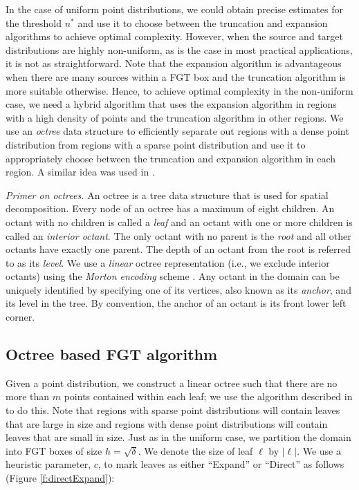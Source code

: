 
 In the case of uniform point distributions, we could obtain precise estimates for the threshold $n^*$ and use it to 
 choose between the truncation and expansion algorithms to achieve optimal complexity. However, when the source and 
 target distributions are highly non-uniform, as is the case in most practical applications, it is not as
 straightforward. Note that the expansion algorithm is advantageous when there are many sources within a FGT box and
 the truncation algorithm is more suitable otherwise. Hence, to achieve optimal complexity in the non-uniform case, we 
 need a hybrid algorithm that uses the expansion algorithm in regions with a high density of points and the 
 truncation algorithm in other regions. We use an {\em octree} \cite{clr90} data structure to efficiently
 separate out regions with a dense point distribution from regions with a sparse point distribution and use
 it to appropriately choose between the truncation and expansion algorithm in each region. A similar idea was
 used in \cite{veerapaneni08}.  
 
{\em Primer on octrees.} An octree is a tree data structure that is used for spatial decomposition. Every
node of an octree has a maximum of eight children. An octant with no children is
called a {\em leaf} and an octant with one or more children is
called an {\em interior octant}. The only octant with no parent is the
 {\em root} and all other octants have exactly one parent. The depth of an octant 
 from the root is referred to as its {\em level}. We use a {\em linear} octree
representation (i.e., we exclude interior octants) using the {\em
Morton encoding} scheme \cite{morton66}. Any octant in the domain can be uniquely
identified by specifying one of its vertices, also known as its {\em
anchor}, and its level in the tree. By convention, the anchor of an
octant is its front lower left corner. 

\subsection{Octree based FGT algorithm}
\label{sc:octreefgt}

 Given a point distribution, we construct a linear octree such that there are no more than $m$ points contained within each leaf; we
 use the algorithm described in \cite{octPaper08} to do this. Note that regions with sparse point distributions will contain 
 leaves that are large in size and regions with dense point distributions will contain leaves that are small in size. Just as in 
 the uniform case, we partition the domain into FGT boxes of size $h = \sqrt{\delta}$. We denote the size of leaf $\ell$ by $|\ell|$.
 We use a heuristic parameter, $c$, to mark leaves as either ``Expand'' or ``Direct'' as follows (Figure \ref{f:directExpand}):

